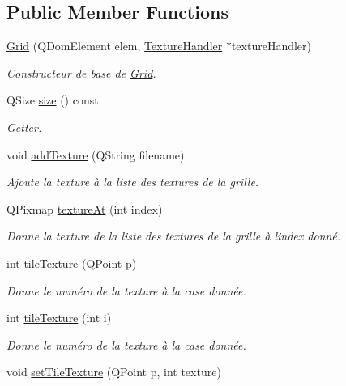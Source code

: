 \subsection*{Public Member Functions}
\begin{DoxyCompactItemize}
\item 
\hyperlink{class_grid_a4d98f6e0a0a048fbce5b77fbc0cba646}{Grid} (Q\+Dom\+Element elem, \hyperlink{class_texture_handler}{Texture\+Handler} $\ast$texture\+Handler)
\begin{DoxyCompactList}\small\item\em Constructeur de base de \hyperlink{class_grid}{Grid}. \end{DoxyCompactList}\item 
Q\+Size \hyperlink{class_grid_aa79281119d2e4644d53c9fba286b5dad}{size} () const 
\begin{DoxyCompactList}\small\item\em Getter. \end{DoxyCompactList}\item 
void \hyperlink{class_grid_ad7b1701e7ba881746363ad87aee5c879}{add\+Texture} (Q\+String filename)
\begin{DoxyCompactList}\small\item\em Ajoute la texture à la liste des textures de la grille. \end{DoxyCompactList}\item 
Q\+Pixmap \hyperlink{class_grid_a1e092c1365a7e1759a169de4e305c777}{texture\+At} (int index)
\begin{DoxyCompactList}\small\item\em Donne la texture de la liste des textures de la grille à l\textquotesingle{}index donné. \end{DoxyCompactList}\item 
int \hyperlink{class_grid_aeb52c62fd156c4169463d3f6cff8208e}{tile\+Texture} (Q\+Point p)
\begin{DoxyCompactList}\small\item\em Donne le numéro de la texture à la case donnée. \end{DoxyCompactList}\item 
int \hyperlink{class_grid_af6f09b36ec823d16065f2f8c997ba071}{tile\+Texture} (int i)
\begin{DoxyCompactList}\small\item\em Donne le numéro de la texture à la case donnée. \end{DoxyCompactList}\item 
void \hyperlink{class_grid_abf2e8bc6fe111e3228fea6a496befc16}{set\+Tile\+Texture} (Q\+Point p, int texture)

\end{DoxyCompactItemize}
